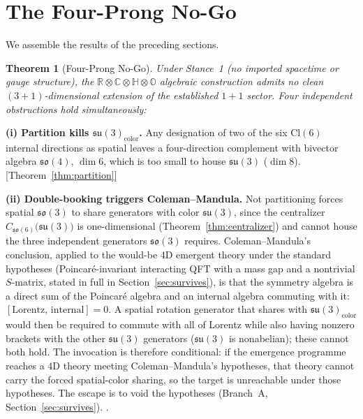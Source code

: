 \documentclass[aip,jmp,amsmath,amssymb,reprint,author-year]{revtex4-2}
\newtheorem{theorem}{Theorem}
\begin{document}
\section{The Four-Prong No-Go}
\label{sec:nogo}

We assemble the results of the preceding sections.

\begin{theorem}[Four-Prong No-Go]
\label{thm:nogo}
Under Stance~1 (no imported spacetime or gauge structure), the\/
$\mathbb{R} \otimes \mathbb{C} \otimes \mathbb{H} \otimes \mathbb{O}$
algebraic construction admits no clean $(3{+}1)$-dimensional extension of
the established $1{+}1$ sector.  Four independent obstructions hold
simultaneously:
\end{theorem}

\noindent
\textbf{(i) Partition kills $\mathfrak{su}(3)_{\mathrm{color}}$.}
Any designation of two of the six $\mathrm{Cl}(6)$ internal directions as
spatial leaves a four-direction complement with bivector algebra
$\mathfrak{so}(4)$, $\dim 6$, which is too small to house
$\mathfrak{su}(3)$ ($\dim 8$).
[Theorem~\ref{thm:partition}]

\medskip\noindent
\textbf{(ii) Double-booking triggers Coleman--Mandula.}
Not partitioning forces spatial $\mathfrak{so}(3)$ to share generators
with color $\mathfrak{su}(3)$, since the centralizer
$C_{\mathfrak{so}(6)}\!\bigl(\mathfrak{su}(3)\bigr)$ is one-dimensional
(Theorem~\ref{thm:centralizer}) and cannot house the three independent
generators $\mathfrak{so}(3)$ requires.  Coleman--Mandula's conclusion,
applied to the would-be 4D emergent theory under the standard hypotheses
(Poincar\'{e}-invariant interacting QFT with a mass gap and a nontrivial
$S$-matrix, stated in full in Section~\ref{sec:survives}), is that the
symmetry algebra is a direct sum of the Poincar\'{e} algebra and an
internal algebra commuting with it:
$[\text{Lorentz},\,\text{internal}] = 0$.  A spatial rotation generator
that shares with $\mathfrak{su}(3)_{\mathrm{color}}$ would then be
required to commute with all of Lorentz while also having nonzero
brackets with the other $\mathfrak{su}(3)$ generators
($\mathfrak{su}(3)$ is nonabelian); these cannot both hold.  The
invocation is therefore conditional: if the emergence programme reaches a
4D theory meeting Coleman--Mandula's hypotheses, that theory cannot carry
the forced spatial-color sharing, so the target is unreachable under
those hypotheses.  The escape is to void the hypotheses (Branch~A,
Section~\ref{sec:survives}).
\citep{ColemanMandula1967,HLS1975}.
\end{document}
